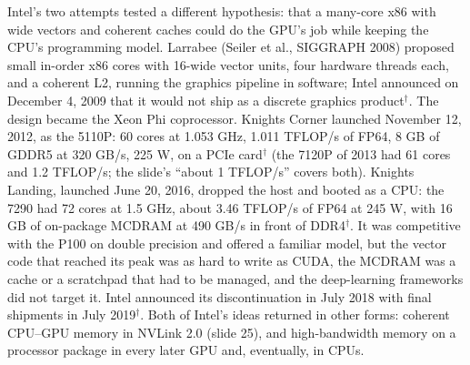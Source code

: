 \documentclass[11pt,letterpaper]{article}
\begin{document}
Intel's two attempts tested a different hypothesis: that a many-core x86 with wide vectors and coherent caches could do the GPU's job while keeping the CPU's programming model. Larrabee (Seiler et al., SIGGRAPH 2008) proposed small in-order x86 cores with 16-wide vector units, four hardware threads each, and a coherent L2, running the graphics pipeline in software; Intel announced on December 4, 2009 that it would not ship as a discrete graphics product$^\dagger$. The design became the Xeon Phi coprocessor. Knights Corner launched November 12, 2012, as the 5110P: 60 cores at 1.053 GHz, 1.011 TFLOP/s of FP64, 8 GB of GDDR5 at 320 GB/s, 225 W, on a PCIe card$^\dagger$ (the 7120P of 2013 had 61 cores and 1.2 TFLOP/s; the slide's ``about 1 TFLOP/s'' covers both). Knights Landing, launched June 20, 2016, dropped the host and booted as a CPU: the 7290 had 72 cores at 1.5 GHz, about 3.46 TFLOP/s of FP64 at 245 W, with 16 GB of on-package MCDRAM at 490 GB/s in front of DDR4$^\dagger$. It was competitive with the P100 on double precision and offered a familiar model, but the vector code that reached its peak was as hard to write as CUDA, the MCDRAM was a cache or a scratchpad that had to be managed, and the deep-learning frameworks did not target it. Intel announced its discontinuation in July 2018 with final shipments in July 2019$^\dagger$. Both of Intel's ideas returned in other forms: coherent CPU--GPU memory in NVLink 2.0 (slide 25), and high-bandwidth memory on a processor package in every later GPU and, eventually, in CPUs.
\end{document}
